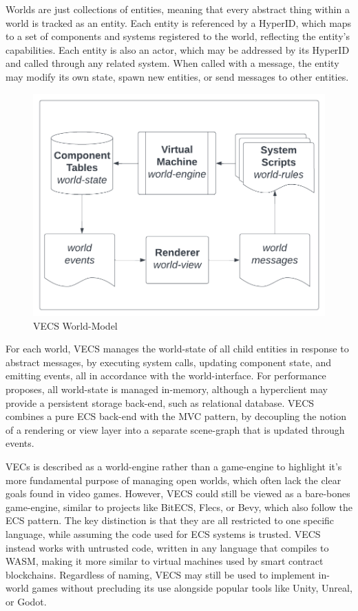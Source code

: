 \documentclass[twocolumn, 10pt]{article}
\begin{document}
Worlds are just collections of entities, meaning that every abstract thing within a world is tracked as an entity. Each entity is referenced by a HyperID, which maps to a set of components and systems registered to the world, reflecting the entity's capabilities. Each entity is also an actor, which may be addressed by its HyperID and called through any related system. When called with a message, the entity may modify its own state, spawn new entities, or send messages to other entities. 

\begin{figure}
    \centering
    \includegraphics{images/vecs.png}
    \caption{VECS World-Model}
    \label{fig:my_label}
\end{figure}

For each world, VECS manages the world-state of all child entities in response to abstract messages, by executing system calls, updating component state, and emitting events, all in accordance with the world-interface. For performance proposes, all world-state is managed in-memory, although a hyperclient may provide a persistent storage back-end, such as relational database. VECS combines a pure ECS back-end with the MVC pattern, by decoupling the notion of a rendering or view layer into a separate scene-graph that is updated through events. 

VECs is described as a world-engine rather than a game-engine to highlight it’s more fundamental purpose of managing open worlds, which often lack the clear goals found in video games. However, VECS could still be viewed as a bare-bones game-engine, similar to projects like BitECS, Flecs, or Bevy, which also follow the ECS pattern. The key distinction is that they are all restricted to one specific language, while assuming the code used for ECS systems is trusted. VECS instead works with untrusted code, written in any language that compiles to WASM, making it more similar to virtual machines used by smart contract blockchains. Regardless of naming, VECS may still be used to implement in-world games without precluding its use alongside popular tools like Unity, Unreal, or Godot.
\end{document}
